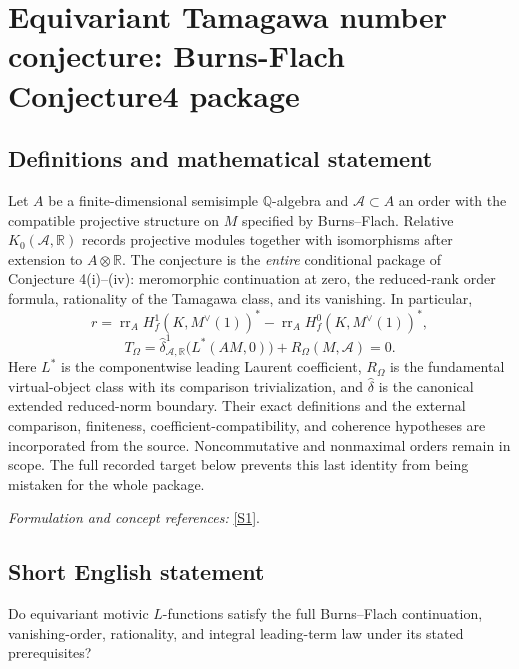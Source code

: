 \documentclass[11pt]{article}
\begin{document}
\section*{\texorpdfstring{Equivariant Tamagawa number conjecture: Burns-Flach Conjecture4 package}{Equivariant Tamagawa number conjecture: Burns-Flach Conjecture4 package}}\label{58}
\subsection{Definitions and mathematical statement}
Let $A$ be a finite-dimensional semisimple ${\mathbb{Q}}$-algebra and $\mathcal A\subset A$ an order with the compatible projective structure on $M$ specified by Burns--Flach. Relative $K_0(\mathcal A,{\mathbb{R}})$ records projective modules together with isomorphisms after extension to $A\otimes{\mathbb{R}}$. The conjecture is the \emph{entire} conditional package of Conjecture 4(i)--(iv): meromorphic continuation at zero, the reduced-rank order formula, rationality of the Tamagawa class, and its vanishing. In particular,
\[
 r=\operatorname{rr}_A H_f^1(K,M^\vee(1))^*
   -\operatorname{rr}_A H_f^0(K,M^\vee(1))^*,
\]
\[
 T_\Omega=\widehat\delta^1_{\mathcal A,{\mathbb{R}}}\bigl(L^*(AM,0)\bigr)
             +R_\Omega(M,\mathcal A)=0.
\]
Here $L^*$ is the componentwise leading Laurent coefficient, $R_\Omega$ is the fundamental virtual-object class with its comparison trivialization, and $\widehat\delta$ is the canonical extended reduced-norm boundary. Their exact definitions and the external comparison, finiteness, coefficient-compatibility, and coherence hypotheses are incorporated from the source. Noncommutative and nonmaximal orders remain in scope. The full recorded target below prevents this last identity from being mistaken for the whole package.
\par\smallskip\textit{Formulation and concept references:} \href{https://ems.press/content/serial-article-files/25892}{[S1]}.

\subsection{Short English statement}
Do equivariant motivic $L$-functions satisfy the full Burns--Flach continuation, vanishing-order, rationality, and integral leading-term law under its stated prerequisites?
\end{document}
